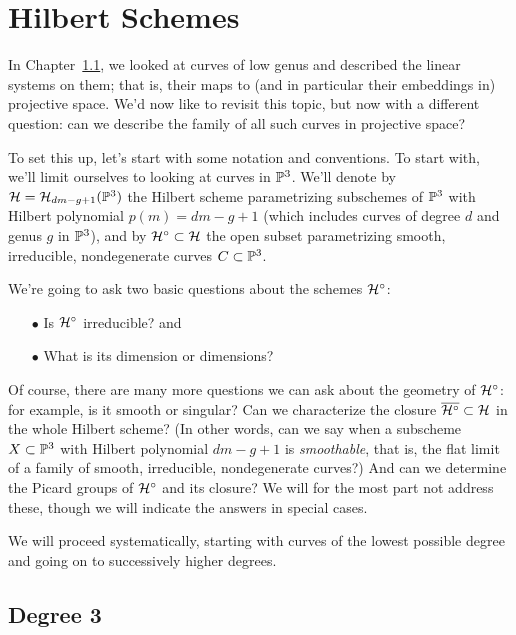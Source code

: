 

\chapter{Hilbert Schemes}
\label{HilbertSchemesChapter}

In Chapter~\ref{}, we looked at curves of low genus and described the linear systems on them; that is, their maps to (and in particular their embeddings in) projective space. We'd now like to revisit this topic, but now with a different question: can we describe the family of all such curves in projective space?

To set this up, let's start with some notation and conventions. To start with, we'll limit ourselves to looking at curves in ${\mathbb P}^3$. We'll denote by ${\cal H} = {\cal H}_{dm-g+1}({\mathbb P}^3)$ the Hilbert scheme parametrizing subschemes of ${\mathbb P}^3$ with Hilbert polynomial $p(m) = dm-g+1$ (which includes
curves of degree $d$ and genus $g$ in ${\mathbb P}^3$), and by ${\cal H}^\circ \subset {\cal H}$ the open subset parametrizing smooth, irreducible, nondegenerate curves $C \subset {\mathbb P}^3$. 

We're going to ask two basic questions about the schemes ${\cal H}^\circ$:

\begin{enumerate}
\item[$\bullet$] Is ${\cal H}^\circ$ irreducible? and
\item[$\bullet$]  What is its dimension or dimensions?
\end{enumerate}

Of course, there are many more questions we can ask about the geometry of ${\cal H}^\circ$: for example, is it smooth or singular? Can we characterize the closure $\overline{{\cal H}^\circ} \subset {\cal H}$ in the whole Hilbert scheme? (In other words, can we say when a subscheme $X \subset {\mathbb P}^3$ with Hilbert polynomial $dm-g+1$ is \emph{smoothable}, that is, the flat limit of a family of smooth, irreducible, nondegenerate curves?) And can we determine the Picard groups of ${\cal H}^\circ$ and its closure? We will for the most part not address these, though we will indicate the answers in special cases.

We will proceed systematically, starting with curves of the lowest possible degree and going on to successively higher degrees.

\section{Degree 3}


